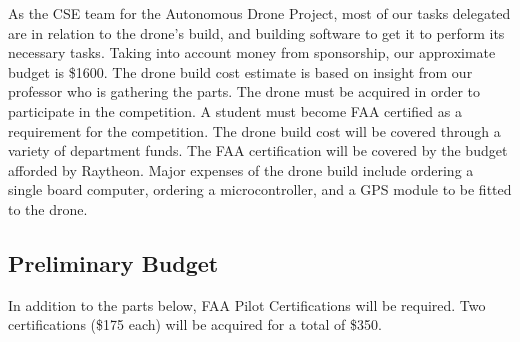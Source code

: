 
As the CSE team for the Autonomous Drone Project, most of our tasks delegated are in relation to the drone's build, and building software to get it to perform its necessary tasks. Taking into account money from sponsorship, our approximate budget is \$1600. The drone build cost estimate is based on insight from our professor who is gathering the parts. The drone must be acquired in order to participate in the competition. A student must become FAA certified as a requirement for the competition. The drone build cost will be covered through a variety of department funds. The FAA certification will be covered by the budget afforded by Raytheon. Major expenses of the drone build include ordering a single board computer, ordering a microcontroller, and a GPS module to be fitted to the drone.

\newpage
\subsection{Preliminary Budget}
In addition to the parts below, FAA Pilot Certifications will be required. Two certifications (\$175 each) will be acquired for a total of \$350.

